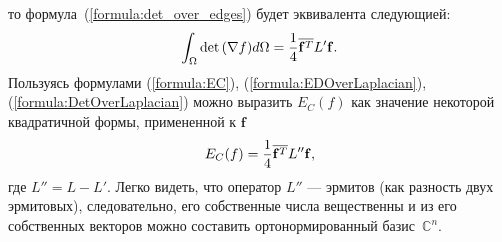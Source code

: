 то формула~(\ref{formula:det_over_edges}) будет эквивалента следующией:
\begin{equation}
\label{formula:DetOverLaplacian}
  \int_{\Omega} \det {\left( \nabla f \right) } d\Omega = \frac{1}{4} \overline{\mathbf{f}^T} L' \mathbf{f}.
\end{equation}
Пользуясь формулами (\ref{formula:EC}), (\ref{formula:EDOverLaplacian}), 
(\ref{formula:DetOverLaplacian}) можно выразить $E_C(f)$ как значение некоторой квадратичной 
формы, примененной к $\mathbf{f}$
\begin{equation*}
  E_C(f) = \frac{1}{4}\overline{\mathbf{f}^T} L'' \mathbf{f},
\end{equation*}
где $L'' = L - L'$. Легко видеть, что оператор $L''$ --- эрмитов (как разность двух эрмитовых), 
следовательно, его собственные числа вещественны и из его собственных векторов можно составить 
ортонормированный базис~$\mathbb{C}^n$.
